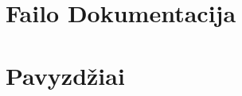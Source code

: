\documentclass[twoside]{book}
\newcommand{\+}{\discretionary{\mbox{\scriptsize$\hookleftarrow$}}{}{}}
\newcommand{\clearemptydoublepage}{%
    \newpage{\pagestyle{empty}\cleardoublepage}%
  }
\begin{document}
\chapter{Failo Dokumentacija}




















\chapter{Pavyzdžiai}

  \backmatter
  \newpage
  \clearemptydoublepage
  \printindex
\end{document}
